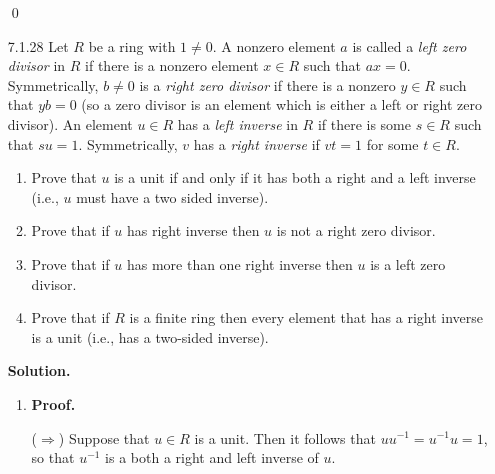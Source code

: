 \begin{enumerate}
      \qed
   \item[7.1.28]  Let $R$ be a ring with $1 \neq 0$. A nonzero element $a$ is
                  called a \textit{left zero divisor} in $R$ if there is a
                  nonzero element $x \in R$ such that $ax = 0$. Symmetrically,
                  $b \neq 0$ is a \textit{right zero divisor} if there is a
                  nonzero $y \in R$ such that $yb = 0$ (so a zero divisor is an
                  element which is either a left or right zero divisor). An
                  element $u \in R$ has a \textit{left inverse} in $R$ if there
                  is some $s \in R$ such that $su = 1$. Symmetrically, $v$ has
                  a \textit{right inverse} if $vt = 1$ for some $t \in R$.
                  \begin{enumerate}
                     \item Prove that $u$ is a unit if and only if it has both a
                           right and a left inverse (i.e., $u$ must have a two
                           sided inverse).
                     \item Prove that if $u$ has right inverse then $u$ is not
                           a right zero divisor.
                     \item Prove that if $u$ has more than one right inverse
                           then $u$ is a left zero divisor.
                     \item Prove that if $R$ is a finite ring then every element
                           that has a right inverse is a unit (i.e., has a
                           two-sided inverse).
                  \end{enumerate}

      \textbf{Solution.}

      \begin{enumerate}
         \item \textbf{Proof.}

               ($\Rightarrow$) Suppose that $u \in R$ is a unit. Then it follows
               that $uu^{-1} = u^{-1}u = 1$, so that $u^{-1}$ is a both a right
               and left inverse of $u$.


\end{enumerate}
\end{enumerate}
